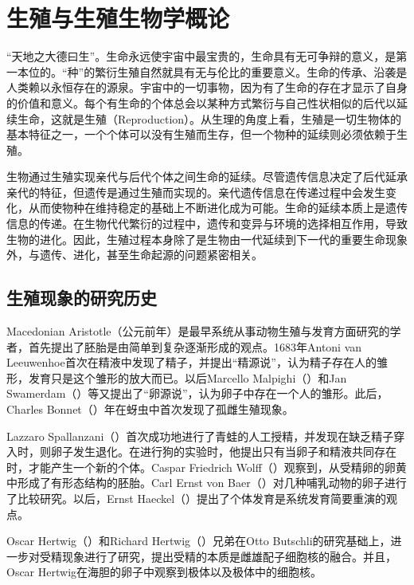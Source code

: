 \chapter{生殖与生殖生物学概论}

``天地之大德曰生''。生命永远使宇宙中最宝贵的，生命具有无可争辩的意义，是第一本位的。``种''的繁衍生殖自然就具有无与伦比的重要意义。生命的传承、沿袭是人类赖以永恒存在的源泉。宇宙中的一切事物，因为有了生命的存在才显示了自身的价值和意义。每个有生命的个体总会以某种方式繁衍与自己性状相似的后代以延续生命，这就是生殖（Reproduction）。从生理的角度上看，生殖是一切生物体的基本特征之一，一个个体可以没有生殖而生存，但一个物种的延续则必须依赖于生殖。

生物通过生殖实现亲代与后代个体之间生命的延续。尽管遗传信息决定了后代延承亲代的特征，但遗传是通过生殖而实现的。亲代遗传信息在传递过程中会发生变化，从而使物种在维持稳定的基础上不断进化成为可能。生命的延续本质上是遗传信息的传递。在生物代代繁衍的过程中，遗传和变异与环境的选择相互作用，导致生物的进化。因此，生殖过程本身除了是生物由一代延续到下一代的重要生命现象外，与遗传、进化，甚至生命起源的问题紧密相关。

\section{生殖现象的研究历史}

Macedonian Aristotle（公元前年）是最早系统从事动物生殖与发育方面研究的学者，首先提出了胚胎是由简单到复杂逐渐形成的观点。1683年Antoni van Leeuwenhoe首次在精液中发现了精子，并提出``精源说''，认为精子存在人的雏形，发育只是这个雏形的放大而已。以后Marcello Malpighi（）和Jan Swamerdam（）等又提出了``卵源说''，认为卵子中存在一个人的雏形。此后，Charles Bonnet（）年在蚜虫中首次发现了孤雌生殖现象。

Lazzaro Spallanzani（）首次成功地进行了青蛙的人工授精，并发现在缺乏精子穿入时，则卵子发生退化。在进行狗的实验时，他提出只有当卵子和精液共同存在时，才能产生一个新的个体。Caspar Friedrich Wolff（）观察到，从受精卵的卵黄中形成了有形态结构的胚胎。Carl Ernst von Baer（）对几种哺乳动物的卵子进行了比较研究。以后，Ernst Haeckel（）提出了个体发育是系统发育简要重演的观点。

Oscar Hertwig（）和Richard Hertwig（）兄弟在Otto Butschli的研究基础上，进一步对受精现象进行了研究，提出受精的本质是雌雄配子细胞核的融合。并且，Oscar Hertwig在海胆的卵子中观察到极体以及极体中的细胞核。


